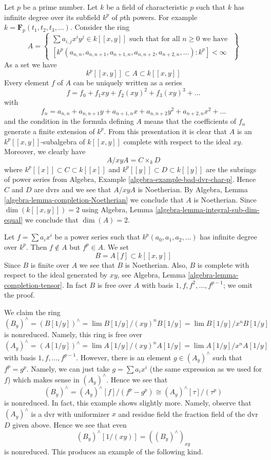 \medskip\noindent
Let $p$ be a prime number. Let $k$ be a field of characteristic $p$
such that $k$ has infinite degree over its subfield $k^p$ of $p$th powers.
For example $k = \mathbf{F}_p(t_1, t_2, t_3, \ldots)$.
Consider the ring
$$
A =
\left\{
\begin{matrix}
\sum a_{i, j} x^iy^j \in k[[x, y]] \text{ such that for all }n \geq 0
\text{ we have } \\
[k^p(a_{n, n}, a_{n, n + 1}, a_{n + 1, n},
a_{n, n + 2}, a_{n + 2, n}, \ldots) : k^p] < \infty
\end{matrix}
\right\}
$$
As a set we have
$$
k^p[[x, y]] \subset A  \subset k[[x, y]]
$$
Every element $f$ of $A$ can be uniquely written as a series
$$
f = f_0 + f_1 xy + f_2 (xy)^2 + f_3 (xy)^3 + \ldots
$$
with
$$
f_n = a_{n, n} + a_{n, n + 1} y + a_{n + 1, n} x +
a_{n, n + 2} y^2 + a_{n + 2, n} x^2 + \ldots
$$
and the condition in the formula defining $A$ means that the
coefficients of $f_n$ generate a finite extension of $k^p$.
From this presentation it is clear that $A$ is an
$k^p[[x, y]]$-subalgebra of $k[[x, y]]$ complete with
respect to the ideal $xy$. Moreover, we clearly have
$$
A/xy A = C \times_k D
$$
where $k^p[[x]] \subset C \subset k[[x]]$ and
$k^p[[y]] \subset D \subset k[[y]]$ are the subrings
of power series from
Algebra, Example \ref{algebra-example-bad-dvr-char-p}.
Hence $C$ and $D$ are dvrs and we see that $A/ xy A$ is
Noetherian. By Algebra, Lemma \ref{algebra-lemma-completion-Noetherian} we
conclude that $A$ is Noetherian. Since $\dim(k[[x, y]]) = 2$ using
Algebra, Lemma \ref{algebra-lemma-integral-sub-dim-equal}
we conclude that $\dim(A) = 2$.

\medskip\noindent
Let $f = \sum a_i x^i$ be a power series such that
$k^p(a_0, a_1, a_2, \ldots)$ has infinite degree over $k^p$.
Then $f \not \in A$ but $f^p \in A$. We set
$$
B = A[f] \subset k[[x, y]]
$$
Since $B$ is finite over $A$ we see that $B$ is Noetherian.
Also, $B$ is  complete with respect to the ideal generated by $xy$, see
Algebra, Lemma \ref{algebra-lemma-completion-tensor}.
In fact $B$ is free over $A$ with basis $1, f, f^2, \ldots, f^{p - 1}$;
we omit the proof.

\medskip\noindent
We claim the ring
$$
(B_y)^\wedge = (B[1/y])^\wedge = \lim B[1/y]/(xy)^n B[1/y] =
\lim B[1/y] / x^n B[1/y]
$$
is nonreduced. Namely, this ring is free over
$$
(A_y)^\wedge = (A[1/y])^\wedge = \lim A[1/y]/(xy)^n A[1/y] =
\lim A[1/y] / x^n A[1/y]
$$
with basis $1, f, \ldots, f^{p - 1}$. However, there is an
element $g \in (A_y)^\wedge$ such that $f^p = g^p$. Namely,
we can just take $g = \sum a_i x^i$ (the same expression as
we used for $f$) which makes sense in $(A_y)^\wedge$.
Hence we see that
$$
(B_y)^\wedge = (A_y)^\wedge[f]/(f^p - g^p) \cong
(A_y)^\wedge[\tau]/(\tau^p)
$$
is nonreduced. In fact, this example shows slightly more.
Namely, observe that $(A_y)^\wedge$ is a dvr with
uniformizer $x$ and residue field the fraction field
of the dvr $D$ given above. Hence we see that even
$$
(B_y)^\wedge[1/(xy)] = ((B_y)^\wedge)_{xy}
$$
is nonreduced. This produces an example of the following kind.

